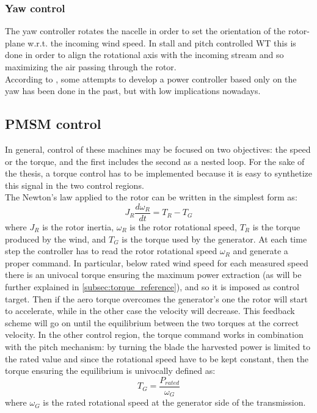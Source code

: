 \subsubsection{Yaw control}
The yaw controller rotates the nacelle in order to set the orientation of the rotor-plane w.r.t. the incoming wind speed. In stall and pitch controlled \acrshort{WT} this is done in order to align the rotational axis with the incoming stream and so maximizing the air passing through the rotor. \\
According to \cite{Aerodynamics_of_wind_turbines}, some attempts to develop a power controller based only on the yaw has been done in the past, but with low implications nowadays. 

\subsection{PMSM control}\label{subsec:PMSM_control}
In general, control of these machines may be focused on two objectives: the speed or the torque, and the first includes the second as a nested loop. For the sake of the thesis, a torque control has to be implemented because it is easy to synthetize this signal in the two control regions. \\
The Newton's law applied to the rotor can be written in the simplest form as:
\begin{equation}
    J_R\frac{d\omega_R}{dt}=T_R-T_G
    \label{eq:simple_dynamic}
\end{equation}
where $J_R$ is the rotor inertia, $\omega_R$ is the rotor rotational speed, $T_R$ is the torque produced by the wind, and $T_G$ is the torque used by the generator. At each time step the controller has to read the rotor rotational speed $\omega_R$ and generate a proper command. In particular, below rated wind speed for each measured speed there is an univocal torque ensuring the maximum power extraction (as will be further explained in \autoref{subsec:torque_reference}), and so it is imposed as control target. Then if the aero torque overcomes the generator's one the rotor will start to accelerate, while in the other case the velocity will decrease. This feedback scheme will go on until the equilibrium between the two torques at the correct velocity. In the other control region, the torque command works in combination with the pitch mechanism: by turning the blade the harvested power is limited to the rated value and since the rotational speed have to be kept constant, then the torque ensuring the equilibrium is univocally defined as: 
\begin{equation}
    T_G=\frac{P_{rated}}{\omega_G}
    \label{eq:simple_torque}
\end{equation}
where $\omega_G$ is the rated rotational speed at the generator side of the transmission. \\

